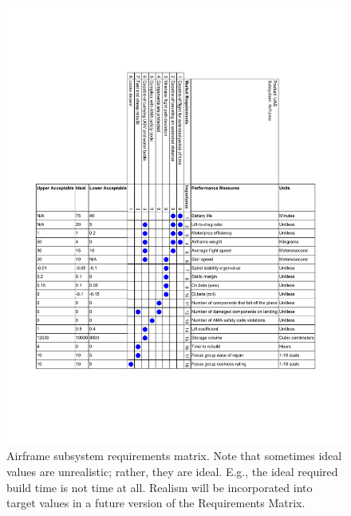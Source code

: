 \documentclass[]{auvsi_doc}
\begin{document}
\begin{AUVSITitlePage}
\begin{artifacttable}
\end{artifacttable}
\end{AUVSITitlePage}

\begin{figure}
	\vspace{-23ex}
		\hspace*{-2.3cm}
		\includegraphics[width=1.3\textwidth]{figs/RequirementsMatrixAirframe.pdf}
		\caption{ Airframe subsystem requirements matrix. Note that sometimes ideal values are unrealistic; rather, they are ideal. E.g., the ideal required build time is not time at all. Realism will be incorporated into target values in a future version of the Requirements Matrix.}
		\label{fig:reqMat}
\end{figure}
\end{document}
